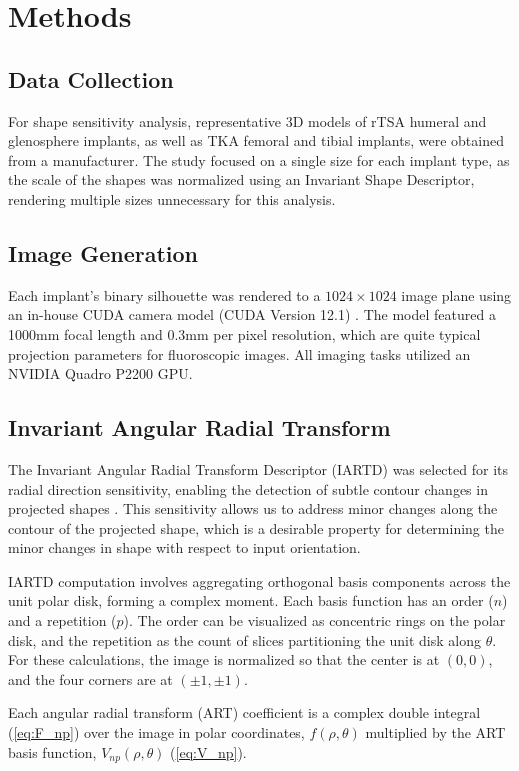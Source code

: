 \section{Methods}

\subsection{Data Collection}
For shape sensitivity analysis, representative 3D models of rTSA humeral and glenosphere implants, as well as TKA femoral and tibial implants, were obtained from a manufacturer.
The study focused on a single size for each implant type, as the scale of the shapes was normalized using an Invariant Shape Descriptor, rendering multiple sizes unnecessary for this analysis.
\subsection{Image Generation}
Each implant's binary silhouette was rendered to a $1024\times 1024$ image plane using an in-house CUDA camera model (CUDA Version 12.1) \cite{nickollsScalableParallelProgramming2008}.
The model featured a 1000mm focal length and 0.3mm per pixel resolution, which are quite typical projection parameters for fluoroscopic images.
All imaging tasks utilized an NVIDIA Quadro P2200 GPU.
\subsection{Invariant Angular Radial Transform}
The Invariant Angular Radial Transform Descriptor (IARTD) was selected for its radial direction sensitivity, enabling the detection of subtle contour changes in projected shapes \cite{leeNewShapeDescription2012}.
This sensitivity allows us to address minor changes along the contour of the projected shape, which is a desirable property for determining the minor changes in shape with respect to input orientation.

IARTD computation involves aggregating orthogonal basis components across the unit polar disk, forming a complex moment.
Each basis function has an order ($n$) and a repetition ($p$).
The order can be visualized as concentric rings on the polar disk, and the repetition as the count of slices partitioning the unit disk along $\theta$.
For these calculations, the image is normalized so that the center is at $(0,0)$, and the four corners are at $(\pm1,\pm1)$.

Each angular radial transform (ART) coefficient is a complex double integral (\cref{eq:F_np}) over the image in polar coordinates, $f(\rho,\theta)$ multiplied by the ART basis function, $V_{np}(\rho,\theta)$ (\cref{eq:V_np}).

